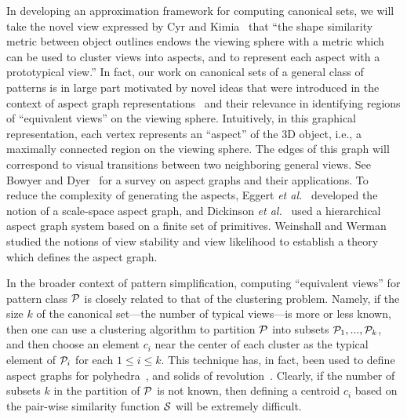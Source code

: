 \documentclass{ieee}
\def\P{{\cal P}}
\def\S{{\cal S}}
\begin{document}
           
                                        

In developing an approximation framework for computing canonical sets,
we will take the novel view expressed by Cyr and Kimia~\cite{Cyr2001}
that ``the shape similarity metric between object outlines endows the
viewing sphere with a metric which can be used to cluster views into
aspects, and to represent each aspect with a prototypical view.'' In
fact, our work on canonical sets of a general class of patterns is in
large part motivated by novel ideas that were introduced in the
context of aspect graph representations~\cite{KOE79} and their
relevance in identifying regions of ``equivalent views'' on the
viewing sphere.  Intuitively, in this graphical representation, each
vertex represents an ``aspect'' of the 3D object, i.e., a maximally
connected region on the viewing sphere. The edges of this graph will
correspond to visual transitions between two neighboring general
views. See Bowyer and Dyer~\cite{Bowyer90} for a survey on aspect
graphs and their applications. To reduce the complexity of generating
the aspects, Eggert {\em et al.}~\cite{EGG93} developed the notion of
a scale-space aspect graph, and Dickinson {\em et al.}~\cite{DIC89}
used a hierarchical aspect graph system based on a finite set of
primitives.  Weinshall and Werman~\cite{WEI97} studied the notions of
view stability and view likelihood to establish a theory which defines
the aspect graph.

In the broader context of pattern simplification, computing
``equivalent views'' for pattern class $\P$ is closely related to that
of the clustering problem. Namely, if the size $k$ of the canonical
set---the number of typical views---is more or less known, then one
can use a clustering algorithm to partition $\P$ into subsets
$\P_1,...,\P_k$, and then choose an element $c_i$ near the center of
each cluster as the typical element of $\P_i$ for each $1\le i\le k$.
This technique has, in fact, been used to define aspect graphs for
polyhedra~\cite{STE88,SHI93}, and solids of revolution~\cite{EGG90}.
Clearly, if the number of subsets $k$ in the partition of $\P$ is not
known, then defining a centroid $c_i$ based on the pair-wise
similarity function $\S$ will be extremely difficult.
\end{document}
